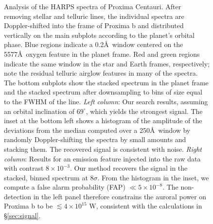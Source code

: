 \documentclass[apjl]{emulateapj}
\begin{document}
\begin{figure}[ht!]
\centering
{}
\hspace{0.1in}
\caption{Analysis of the HARPS spectra of Proxima Centauri. After removing stellar and telluric lines, the individual spectra are Doppler-shifted into the frame of Proxima b and distributed vertically on the main subplots according to the planet's orbital phase. Blue regions indicate a 0.2\AA\ window centered on the 5577\AA\ oxygen feature in the planet frame. Red and green regions indicate the same window in the star and Earth frames, respectively; note the residual telluric airglow features in many of the spectra. The bottom subplots show the stacked spectrum in the planet frame and the stacked spectrum after downsampling to bins of size equal to the FWHM of the line. \emph{Left column}: Our search results, assuming an orbital inclination of $69^\circ$, which yields the strongest signal. The inset at the bottom left shows a histogram of the amplitude of the deviations from the median computed over a 250\AA\ window by randomly Doppler-shifting the spectra by small amounts and stacking them. The recovered signal is consistent with noise. \emph{Right column}: Results for an emission feature injected into the raw data with contrast $8\times 10^{-3}$. Our method recovers the signal in the stacked, binned spectrum at $8\sigma$.  From the histogram in the inset, we compute a false alarm probability (FAP) $\ll 5\times 10^{-8}$. The non-detection in the left panel therefore constrains the auroral power on Proxima b to be $\lesssim 4\times 10^{15}$ W, consistent with the calculations in \S\ref{sec:signal}.}
\label{fig:detection}
\end{figure}
\end{document}
